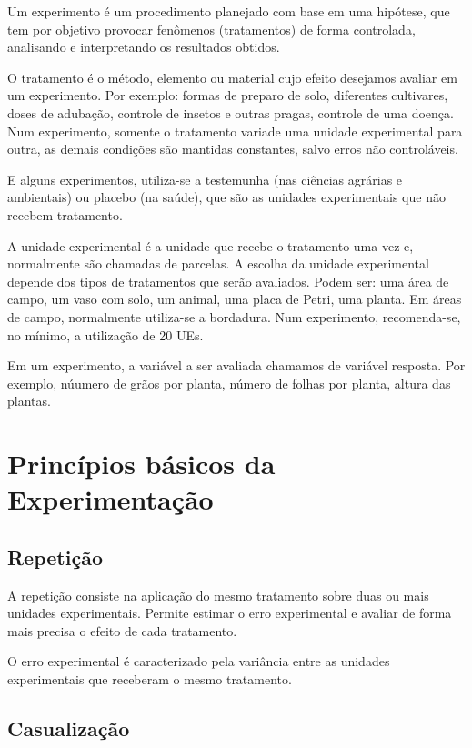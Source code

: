 \documentclass[12pt,brazil,oneside]{book}
\begin{document}
Um experimento é um procedimento planejado com base em uma hipótese, que
tem por objetivo provocar fenômenos (tratamentos) de forma controlada,
analisando e interpretando os resultados obtidos.

O tratamento é o método, elemento ou material cujo efeito desejamos
avaliar em um experimento. Por exemplo: formas de preparo de solo,
diferentes cultivares, doses de adubação, controle de insetos e outras
pragas, controle de uma doença. Num experimento, somente o tratamento
variade uma unidade experimental para outra, as demais condições são
mantidas constantes, salvo erros não controláveis.

E alguns experimentos, utiliza-se a testemunha (nas ciências agrárias e
ambientais) ou placebo (na saúde), que são as unidades experimentais que
não recebem tratamento.

A unidade experimental é a unidade que recebe o tratamento uma vez e,
normalmente são chamadas de parcelas. A escolha da unidade experimental
depende dos tipos de tratamentos que serão avaliados. Podem ser: uma
área de campo, um vaso com solo, um animal, uma placa de Petri, uma
planta. Em áreas de campo, normalmente utiliza-se a bordadura. Num
experimento, recomenda-se, no mínimo, a utilização de 20 UEs.

Em um experimento, a variável a ser avaliada chamamos de variável
resposta. Por exemplo, núumero de grãos por planta, número de folhas por
planta, altura das plantas.

\hypertarget{principios-basicos-da-experimentacao}{%
\section{Princípios básicos da
Experimentação}\label{principios-basicos-da-experimentacao}}

\hypertarget{repeticao}{%
\subsection{Repetição}\label{repeticao}}

A repetição consiste na aplicação do mesmo tratamento sobre duas ou mais
unidades experimentais. Permite estimar o erro experimental e avaliar de
forma mais precisa o efeito de cada tratamento.

O erro experimental é caracterizado pela variância entre as unidades
experimentais que receberam o mesmo tratamento.

\hypertarget{casualizacao}{%
\subsection{Casualização}\label{casualizacao}}
\end{document}
